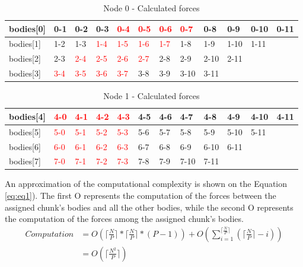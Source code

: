 \documentclass[a4paper]{article}
\begin{document}
\begin{table}[]
\centering
\caption{Node 0 - Calculated forces}
\label{table:t1}
\begin{tabular}{l|lllllllllll}
bodies{[}0{]} & 0-1 & 0-2 & 0-3 & \textcolor{red}{0-4} & \textcolor{red}{0-5} & \textcolor{red}{0-6} & \textcolor{red}{0-7}  & 0-8  & 0-9  & 0-10 & 0-11 \\ \hline
bodies{[}1{]} & 1-2 & 1-3 & \textcolor{red}{1-4} & \textcolor{red}{1-5} & \textcolor{red}{1-6} & \textcolor{red}{1-7} & 1-8  & 1-9  & 1-10 & 1-11 &      \\ \hline
bodies{[}2{]} & 2-3 & \textcolor{red}{2-4} & \textcolor{red}{2-5} & \textcolor{red}{2-6} & \textcolor{red}{2-7} & 2-8 & 2-9  & 2-10 & 2-11 &      &      \\ \hline
bodies{[}3{]} & \textcolor{red}{3-4} & \textcolor{red}{3-5} & \textcolor{red}{3-6} & \textcolor{red}{3-7} & 3-8 & 3-9 & 3-10 & 3-11 &      &      &   
\end{tabular}
\end{table}

\begin{table}[]
\centering
\caption{Node 1 - Calculated forces}
\label{table:t2}
\begin{tabular}{l|lllllllllll}
bodies{[}4{]} & \textcolor{red}{4-0} & \textcolor{red}{4-1} & \textcolor{red}{4-2} & \textcolor{red}{4-3} & 4-5 & 4-6 & 4-7  & 4-8  & 4-9  & 4-10 & 4-11 \\ \hline
bodies{[}5{]} & \textcolor{red}{5-0} & \textcolor{red}{5-1} & \textcolor{red}{5-2} & \textcolor{red}{5-3} & 5-6 & 5-7 & 5-8  & 5-9  & 5-10 & 5-11 &      \\ \hline
bodies{[}6{]} & \textcolor{red}{6-0} & \textcolor{red}{6-1} & \textcolor{red}{6-2} & \textcolor{red}{6-3} & 6-7 & 6-8 & 6-9  & 6-10 & 6-11 &      &      \\ \hline
bodies{[}7{]} & \textcolor{red}{7-0} & \textcolor{red}{7-1} & \textcolor{red}{7-2} & \textcolor{red}{7-3} & 7-8 & 7-9 & 7-10 & 7-11 &      &      &     
\end{tabular}
\end{table}


An approximation of the computational complexity is shown on the Equation \ref{eq:eq1}). The first O represents the computation of the forces between the assigned chunk's bodies and all the other bodies, while the second O represents the computation of the forces among the assigned chunk's bodies. \\

\begin{equation} 
\label{eq:eq1}
\begin{split}
Computation & = O(\lceil\frac{N}{P}\rceil * \lceil\frac{N}{P}\rceil * (P-1)) +  O(\sum_{i=1}^{\lceil\frac{N}{P}\rceil} {(\lceil\frac{N}{P}\rceil-i)})\\
 & = O(\lceil\frac{N^2}{P}\rceil)
\end{split}
\end{equation}
\end{document}
